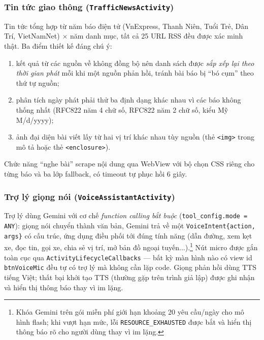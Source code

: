 \subsubsection{Tin tức giao thông (\texttt{TrafficNewsActivity})}
Tin tức tổng hợp từ năm báo điện tử (VnExpress, Thanh Niên, Tuổi Trẻ, Dân Trí, VietNamNet) $\times$ năm danh mục, tất cả 25 URL RSS đều được xác minh thật. Ba điểm thiết kế đáng chú ý:
\begin{enumerate}[label=(\roman*),leftmargin=2.2cm,itemsep=2pt]
 \item kết quả từ các nguồn về không đồng bộ nên danh sách được \textit{sắp xếp lại theo thời gian phát} mỗi khi một nguồn phản hồi, tránh bài báo bị ``bó cụm'' theo thứ tự nguồn;
 \item phân tích ngày phát phải thử ba định dạng khác nhau vì các báo không thống nhất (RFC822 năm 4 chữ số, RFC822 năm 2 chữ số, kiểu Mỹ M/d/yyyy);
 \item ảnh đại diện bài viết lấy từ hai vị trí khác nhau tùy nguồn (thẻ \texttt{<img>} trong mô tả hoặc thẻ \texttt{<enclosure>}).
\end{enumerate}
Chức năng ``nghe bài'' scrape nội dung qua WebView với bộ chọn CSS riêng cho từng báo và ba lớp fallback, có timeout tự phục hồi 6 giây.

\subsubsection{Trợ lý giọng nói (\texttt{VoiceAssistantActivity})}
Trợ lý dùng Gemini với cơ chế \textit{function calling bắt buộc} (\texttt{tool\_config.mode = ANY}): giọng nói chuyển thành văn bản, Gemini trả về một \texttt{VoiceIntent\{action, args\}} có cấu trúc, ứng dụng điều phối tới đúng tính năng (dẫn đường, xem kẹt xe, đọc tin, gọi xe, chia sẻ vị trí, mở bản đồ ngoại tuyến...).\footnote{Khóa Gemini trên gói miễn phí giới hạn khoảng 20 yêu cầu/ngày cho mô hình flash; khi vượt hạn mức, lỗi \texttt{RESOURCE\_EXHAUSTED} được bắt và hiển thị thông báo rõ cho người dùng thay vì im lặng.} Nút micro được gắn toàn cục qua \texttt{ActivityLifecycleCallbacks} --- bất kỳ màn hình nào có view id \texttt{btnVoiceMic} đều tự có trợ lý mà không cần lặp code. Giọng phản hồi dùng TTS tiếng Việt; thất bại khởi tạo TTS (thường gặp trên trình giả lập) được ghi nhận và hiển thị thông báo thay vì im lặng.

